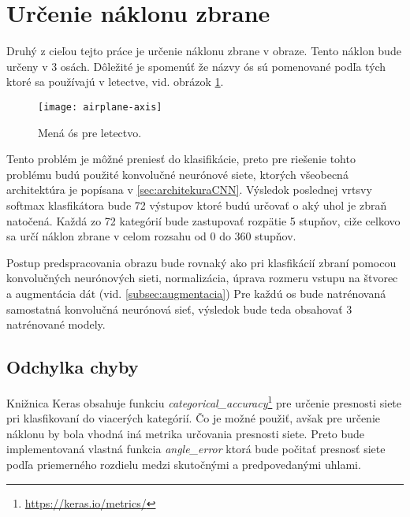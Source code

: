 
\section{Určenie náklonu zbrane}
Druhý z cieľou tejto práce je určenie náklonu zbrane v obraze.
Tento náklon bude určeny v 3 osách.
Dôležité je spomenúť že názvy ós sú pomenované podľa tých ktoré sa používajú v letectve, vid. obrázok \ref{pic:airplaneaxis}.
\begin{figure}[H]
    \centering
    \texttt{[image: airplane-axis]}
    \caption{Mená ós pre letectvo.}
    \label{pic:airplaneaxis}
\end{figure}

Tento problém je môžné preniesť do klasifikácie, preto pre riešenie tohto problému budú použité konvolučné neurónové siete, ktorých všeobecná architektúra je popísana v \ref{sec:architekuraCNN}.
Výsledok poslednej vrtsvy softmax klasfikátora bude 72 výstupov ktoré budú určovať o aký uhol je zbraň natočená.
Každá zo 72 kategórií bude zastupovať rozpätie 5 stupňov, ciže celkovo sa určí náklon zbrane v celom rozsahu od 0 do 360 stupňov.

Postup predspracovania obrazu bude rovnaký ako pri klasfikácií zbraní pomocou konvolučných neurónových sieti, normalizácia, úprava rozmeru vstupu na štvorec a augmentácia dát (vid. \ref{subsec:augmentacia})
Pre každú os bude natrénovaná samostatná konvolučná neurónová sieť, výsledok bude teda obsahovať 3 natrénované modely.

\subsection{Odchylka chyby}
Knižnica Keras obsahuje funkciu \textit{categorical\_accuracy}\footnote{\url{https://keras.io/metrics/}} pre určenie presnosti siete pri klasfikovaní do viacerých kategórií.
Čo je možné použiť, avšak pre určenie náklonu by bola vhodná iná metrika určovania presnosti siete.
Preto bude implementovaná vlastná funkcia \textit{angle\_error} ktorá bude počitať presnosť siete podľa priemerného rozdielu medzi skutočnými a predpovedanými uhlami.
